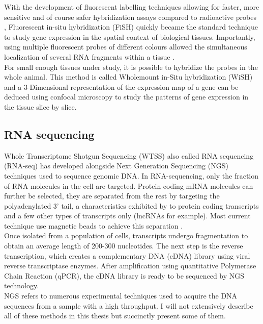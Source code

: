       With the development of fluorescent labelling techniques \cite{landegent84,pinkel88} allowing for faster, more sensitive and of course safer hybridization assays compared to radioactive probes \cite{swiger96}, Fluorescent in-situ hybridization (FiSH) quickly became the standard technique to study gene expression in the spatial context of biological tissues. Importantly, using multiple fluorescent probes of different colours allowed the simultaneous localization of several RNA fragments within a tissue \cite{nederlof89}.\\
     
     For small enough tissues under study, it is possible to hybridize the probes in the whole animal. This method is called Wholemount in-Situ hybridization (WiSH) and a 3-Dimensional representation of the expression map of a gene can be deduced using confocal microscopy to study the patterns of gene expression in the tissue slice by slice.
     

     \subsection{RNA sequencing}
     Whole Transcriptome Shotgun Sequencing (WTSS) also called RNA sequencing (RNA-seq) \cite{morin08,wang09} has developed alongside Next Generation Sequencing (NGS) techniques used to sequence genomic DNA. In RNA-sequencing, only the fraction of RNA molecules in the cell are targeted. Protein coding mRNA molecules can further be selected, they are separated from the rest by targeting the polyadenylated 3' tail, a characteristics exhibited by to protein coding transcripts and a few other types of transcripts only (lncRNAs for example). Most current technique use magnetic beads to achieve this separation \cite{mortazavi08,morin08}.\\
     
    Once isolated from a population of cells, transcripts undergo fragmentation to obtain an average length of 200-300 nucleotides. The next step is the reverse transcription, which creates a complementary DNA (cDNA) library using viral reverse transcriptase enzymes. After amplification using quantitative Polymerase Chain Reaction (qPCR), the cDNA library is ready to be sequenced by NGS technology.\\
    
    NGS refers to numerous experimental techniques used to acquire the DNA sequences from a sample with a high throughput. I will not extensively describe all of these methods in this thesis but succinctly present some of them. 
    
